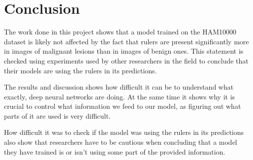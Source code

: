 \chapter{Conclusion}
The work done in this project shows that a model trained on the HAM10000 
dataset is likely not affected by the fact that rulers are present significantly
more in images of malignant lesions than in images of benign ones.
This statement is checked using experiments used by other researchers in the field
to conclude that their models are using the rulers in its predictions.

The results and discussion shows how difficult it can be to understand what
exactly, deep neural networks are doing.
At the same time it shows why it is crucial to control what information we feed
to our model, as figuring out what parts of it are used is very difficult.

How difficult it was to check if the model was using the rulers in its predictions
also show that researchers have to be cautious when concluding that a model
they have trained is or isn't using some part of the provided information.